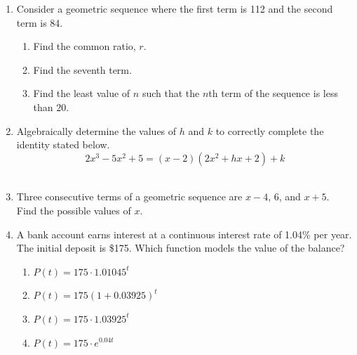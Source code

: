\documentclass[12pt, oneside]{article}
\begin{document}
\begin{enumerate}
\item Consider a geometric sequence where the first term is 112 and the second term is 84.
\begin{enumerate}
    \item Find the common ratio, $r$.\\[20pt]
        \begin{flushright}[1]\end{flushright}
    \item Find the seventh term.\\[80pt]
        \begin{flushright}[2]\end{flushright}
    \item Find the least value of $n$ such that the $n$th term of the sequence is less than 20. \\[80pt]
        \begin{flushright}[3]\end{flushright}
\end{enumerate}

\newpage
\item Algebraically determine the values of $h$ and $k$ to correctly complete the identity stated below.
\[2x^3-5x^2+5=(x-2)(2x^2+hx+2)+k\] \\[2in] 
        \begin{flushright}[4]\end{flushright}

\item Three consecutive terms of a geometric sequence are $x-4$, 6, and $x+5$.\\
Find the possible values of $x$.\\[3in]
    \begin{flushright}[6]\end{flushright}

\newpage
\item A bank account earns interest at a continuous interest rate of 1.04\% per year. The initial deposit is \$175. Which function models the value of the balance? \qquad [2]
\begin{enumerate}
    \item $P(t)=175 \cdot 1.01045^{t}$
    \item $P(t)=175 (1+0.03925)^{t}$
    \item $P(t)=175 \cdot 1.03925^{t}$
    \item $P(t)=175 \cdot e^{0.04t}$
\end{enumerate}



\end{enumerate}
\end{document}
